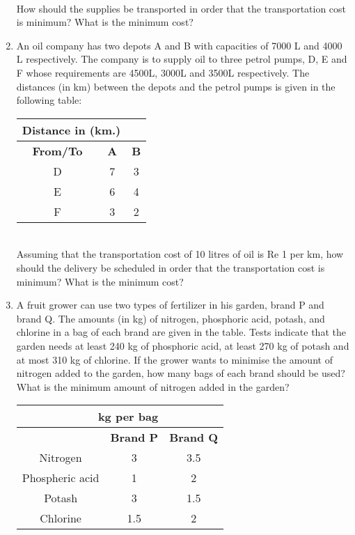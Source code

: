 \begin{enumerate}[label=\arabic*.,ref=\thesubsection.\theenumi]
\begin{tabular}{|c|c|c|}
\end{tabular}\\


How should the supplies be transported in order that the transportation cost is
minimum? What is the minimum cost?\\
\item An oil company has two depots A and B with capacities of 7000 L and 4000 L
respectively. The company is to supply oil to three petrol pumps, D, E and F
whose requirements are 4500L, 3000L and 3500L respectively. The distances
(in km) between the depots and the petrol pumps is given in the following table:\\
\begin{tabular}{|c|c|c|}
\hline
 \multicolumn{2}{|l}{\textbf{Distance in (km.)}}& \\ \cline{2-3}
\hline
\textbf {From/To}&\textbf{A}&\textbf{B}\\
\hline
D&7&3\\
\hline
 E&6&4\\
 \hline 
 F&3&2\\
 \hline

\end{tabular}\\

Assuming that the transportation cost of 10 litres of oil is Re 1 per km, how
should the delivery be scheduled in order that the transportation cost is minimum?
What is the minimum cost?\\
\item A fruit grower can use two types of fertilizer in his garden, brand P and brand Q.
The amounts (in kg) of nitrogen, phosphoric acid, potash, and chlorine in a bag of
each brand are given in the table. Tests indicate that the garden needs at least
240 kg of phosphoric acid, at least 270 kg of potash and at most 310 kg of
chlorine.
If the grower wants to minimise the amount of nitrogen added to the garden,
how many bags of each brand should be used? What is the minimum amount of
nitrogen added in the garden?\\
\begin{tabular}{|c|c|c|}
\hline
 \multicolumn{2}{|r}{\textbf{ kg per bag}}& \\ \cline{1-3}
\hline
&\textbf{Brand P}&\textbf{Brand Q}\\
\hline
Nitrogen&3&3.5\\
\hline
Phospheric acid&1&2\\
\hline
Potash&3&1.5\\
\hline
Chlorine&1.5&2\\
\hline


\end{tabular}
\end{enumerate}
